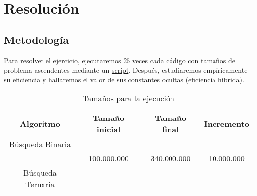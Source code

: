 \documentclass[12pt,spanish]{article}
\begin{document}
\section{Resolución}

\subsection{Metodología}
Para resolver el ejercicio, ejecutaremos 25 veces cada código con tamaños de problema ascendentes mediante un \textcolor{blue!50}{\hyperref[script]{script}}.
Después, estudiaremos empíricamente su eficiencia y hallaremos el valor de sus constantes ocultas (eficiencia híbrida). 

\begin{table}[H]
\centering
\begin{tabular}{|c|c|c|c|}
\hline
\textbf{Algoritmo} & \textbf{Tamaño inicial} & \textbf{Tamaño final} & \textbf{Incremento}\\
\hline
Búsqueda Binaria & & &\\
& 100.000.000 & 340.000.000 & 10.000.000\\
Búsqueda Ternaria & & &\\
\hline
\end{tabular}
\caption{Tamaños para la ejecución}
\end{table}
\end{document}
